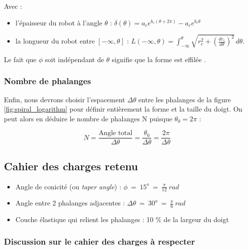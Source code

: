 \documentclass[a4paper, 11pt]{report}
\begin{document}
            Avec :

            \begin{itemize}
                \item l'épaisseur du robot à l'angle $\theta$ : $\delta(\theta) = a_ce^{b_c(\theta + 2\pi)} - a_ce^{b_c\theta}$
                \item la longueur du robot entre $[-\infty,\theta]$ : $L(-\infty, \theta) = \int_{-\infty}^{\theta} \sqrt{r_c^2 + \left(\frac{dr_c}{d\theta}\right)^2} \, d\theta$.
            \end{itemize}

            Le fait que $\phi$ soit indépendant de $\theta$ signifie que la forme est effilée \cite{wang_spirobs_2025}.

        \subsubsection{Nombre de phalanges}
            
            Enfin, nous devrons choisir l'espacement $\Delta\theta$ entre les phalanges de la figure \ref{fig:spiral_logarithm} pour définir entièrement la forme et la taille du doigt. On peut alors en déduire le nombre de phalanges N puisque $\theta_0 = 2\pi$ :
        
            \begin{equation}
                N = \frac{\text{Angle total}}{\Delta \theta}
                = \frac{\theta_0}{\Delta \theta}
                = \frac{2\pi}{\Delta \theta}
                \label{eq:nb_segment}
            \end{equation}

    \subsection{Cahier des charges retenu} 

            \begin{itemize}
                \item Angle de conicité (ou \textit{taper angle}) : $\phi \ = \ 15^o \ = \ \frac{\pi}{12} \ rad$ 
                \item Angle entre 2 phalanges adjacentes : $\Delta \theta \ = \ 30^o \ = \ \frac{\pi}{6} \ rad$
                \item Couche élastique qui relient les phalanges : 10 $\%$ de la largeur du doigt
            \end{itemize}

            \subsubsection{Discussion sur le cahier des charges à respecter}
\end{document}
